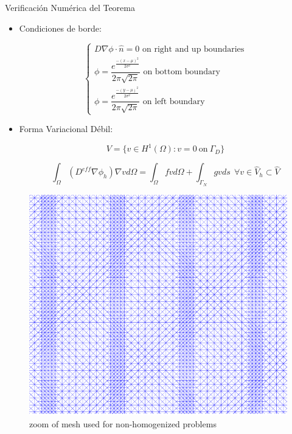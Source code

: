 \documentclass[11pt,spanish]{beamer}
\begin{document}
\begin{frame}{Verificación Numérica del Teorema}

\begin{itemize}

\item Condiciones de borde:

\begin{equation*}
\left\lbrace
\begin{array}{c}
D \nabla \phi \cdot \hat{n} = 0 \text{ on right and up boundaries} \\
\phi = \dfrac{ e^{\frac{-(x - \mu)^2}{2 \sigma^2}}}{2 \pi \sqrt{2 \pi}} \text{ on bottom boundary} \\
\phi = \dfrac{ e^{\frac{-(y - \mu)^2}{2 \sigma^2}}}{2 \pi \sqrt{2 \pi}} \text{ on left boundary}
\end{array}
\right. \label{eq:border_conditions_r1}
\end{equation*}

\item Forma Variacional Débil: 

\begin{equation}
V = \{ v \in H^1(\Omega): v = 0 ~\text{on}~ \Gamma_D \}
\end{equation}

\begin{equation*}
\int_\Omega (D^{eff} \nabla \phi_h) \nabla v d \Omega = \int_\Omega fv d\Omega  + \int_{\Gamma_N} g v ds ~~ \forall v \in \hat{V}_h \subset \hat{V}
\end{equation*}
\end{itemize}
\end{frame}


\begin{frame}
\begin{figure}[H]
\centering
\includegraphics[height = 5 cm]{fig/theorem_verification_r1-mesh_nh} 
\caption{zoom of mesh used for non-homogenized problems}
\end{figure}
\end{frame}
\end{document}
